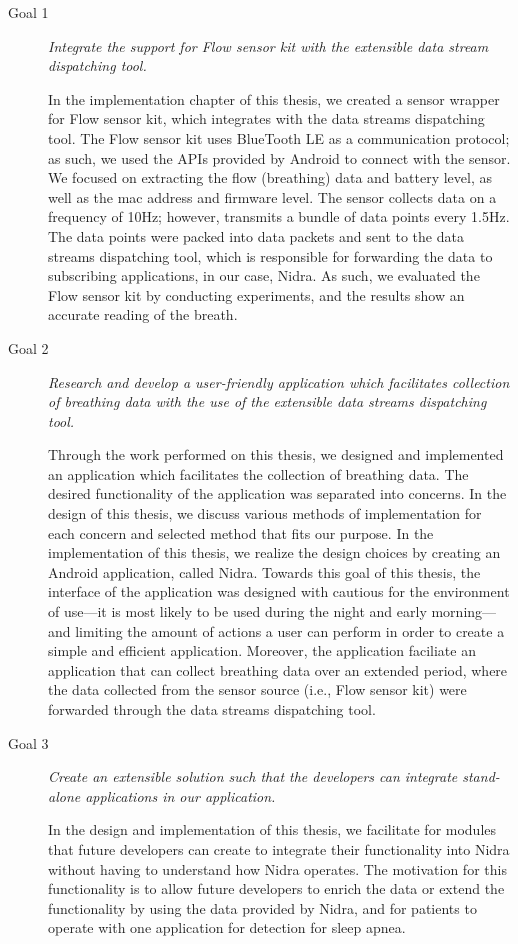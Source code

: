 \begin{description}
    \item[Goal 1] \textit{Integrate the support for Flow sensor kit with the extensible data stream dispatching tool.}

    In the implementation chapter of this thesis, we created a sensor wrapper for Flow sensor kit, which integrates with the data streams dispatching tool. The Flow sensor kit uses BlueTooth LE as a communication protocol; as such, we used the APIs provided by Android to connect with the sensor. We focused on extracting the flow (breathing) data and battery level, as well as the mac address and firmware level. The sensor collects data on a frequency of 10Hz; however, transmits a bundle of data points every 1.5Hz. The data points were packed into data packets and sent to the data streams dispatching tool, which is responsible for forwarding the data to subscribing applications, in our case, Nidra. As such, we evaluated the Flow sensor kit by conducting experiments, and the results show an accurate reading of the breath. 

    \item[Goal 2] \textit{Research and develop a user-friendly application which facilitates collection of breathing data with the use of the extensible data streams dispatching tool.}


    Through the work performed on this thesis, we designed and implemented an application which facilitates the collection of breathing data. The desired functionality of the application was separated into concerns. In the design of this thesis, we discuss various methods of implementation for each concern and selected method that fits our purpose.  In the implementation of this thesis, we realize the design choices by creating an Android application, called Nidra. Towards this goal of this thesis, the interface of the application was designed with cautious for the environment of use---it is most likely to be used during the night and early morning---and limiting the amount of actions a user can perform in order to create a simple and efficient application. Moreover, the application faciliate an application that can collect breathing data over an extended period, where the data collected from the sensor source (i.e., Flow sensor kit) were forwarded through the data streams dispatching tool. 


    \item[Goal 3] \textit{Create an extensible solution such that the developers can integrate stand-alone applications in our application.}

    In the design and implementation of this thesis, we facilitate for modules that future developers can create to integrate their functionality into Nidra without having to understand how Nidra operates. The motivation for this functionality is to allow future developers to enrich the data or extend the functionality by using the data provided by Nidra, and for patients to operate with one application for detection for sleep apnea. 
\end{description}

